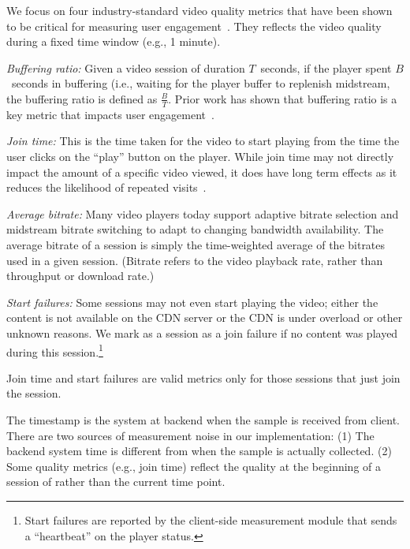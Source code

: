  We focus on four industry-standard video quality metrics that have been shown to be critical for measuring user engagement~\cite{sigcomm11}. They reflects the video quality during a fixed time window (e.g., 1 minute).
\begin{packedenumerate}
\item \emph{Buffering ratio:}  Given a video session of duration $T$~seconds,
if the player spent $B$~seconds in buffering (i.e., waiting for the player
 buffer to replenish midstream, the buffering ratio is defined as
 $\frac{B}{T}$. Prior work has shown that buffering ratio is a key metric
 that impacts user engagement~\cite{sigcomm11}.
\item \emph{Join time:}  This is the time taken for the video to start playing
 from the time the user clicks on the ``play'' button on the player.
 While join time may not directly impact the amount of a specific video viewed,
 it does have long term effects as it reduces the likelihood of repeated
visits~\cite{sigcomm11,akamai-imc12}. 
\item \emph{Average bitrate:} Many video players today support adaptive bitrate
selection and midstream bitrate switching to adapt to changing bandwidth
availability. The average bitrate of a session is simply the time-weighted
average of the bitrates used in a given session. (Bitrate refers to the video playback rate, rather than throughput or download rate.)
\item \emph{Start failures:}   Some sessions may not even start playing the
video; either the content is not available on the CDN server or the CDN is
under overload or other unknown reasons. We mark as a session as a join failure
if no content was played during this session.\footnote{Start failures are
reported by the client-side measurement module that sends a ``heartbeat'' on
the player status.}
\end{packedenumerate}
Join time and start failures are valid metrics only for those sessions that just join the session.

 The timestamp is the system at backend when the sample is received from client. There are two sources of measurement noise in our implementation: (1) The backend system time is different from when the sample is actually collected. (2) Some quality metrics (e.g., join time) reflect the quality at the beginning of a session of rather than the current time point. 

